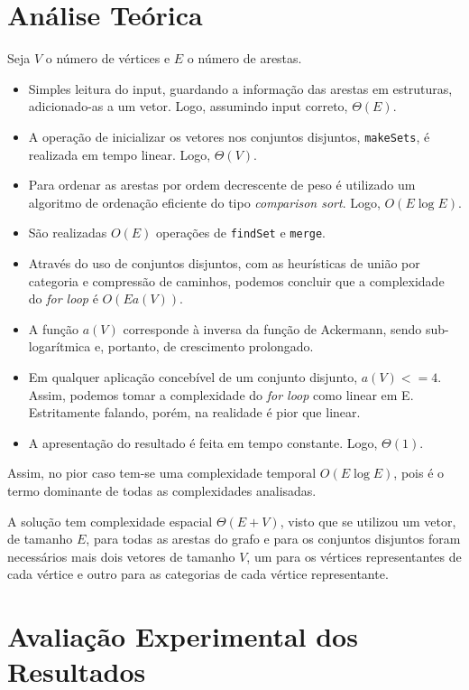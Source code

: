 \documentclass[12pt,a4paper]{article}
\begin{document}
  \section{Análise Teórica}

  Seja $V$ o número de vértices e $E$ o número de arestas.

  \begin{itemize}
    \setlength{\itemsep}{0pt}
    \item Simples leitura do input, guardando a informação das arestas em estruturas, adicionado-as a um vetor. Logo, assumindo input correto, $\Theta(E)$.
    \item A operação de inicializar os vetores nos conjuntos disjuntos, \texttt{makeSets}, é realizada em tempo linear. Logo, $\Theta(V)$.
    \item Para ordenar as arestas por ordem decrescente de peso é utilizado um algoritmo de ordenação eficiente do tipo \textit{comparison sort}. Logo, $O(E\log E)$.
    \item São realizadas $O(E)$ operações de \texttt{findSet} e \texttt{merge}.
    \item Através do uso de conjuntos disjuntos, com as heurísticas de união por categoria e compressão de caminhos, podemos concluir que a complexidade do \textit{for loop} é $O(E a(V))$.
    \item A função $a(V)$ corresponde à inversa da função de Ackermann\cite{enwiki:1123526697}, sendo sub-logarítmica e, portanto, de crescimento prolongado.
    \item Em qualquer aplicação concebível de um conjunto disjunto, $a(V) <= 4$. Assim, podemos tomar a complexidade do \textit{for loop} como linear em E. Estritamente falando, porém, na realidade é pior que linear.
    \item A apresentação do resultado é feita em tempo constante. Logo, $\Theta(1)$.
  \end{itemize}

  Assim, no pior caso tem-se uma complexidade temporal $O(E\log E)$, pois é o termo dominante de todas as complexidades analisadas.

  A solução tem complexidade espacial $\Theta(E + V)$, visto que se utilizou um vetor, de tamanho $E$, para todas as arestas do grafo e para os conjuntos disjuntos foram necessários mais dois vetores de tamanho $V$, um para os vértices representantes de cada vértice e outro para as categorias de cada vértice representante.

  \section{Avaliação Experimental dos Resultados}
\end{document}
